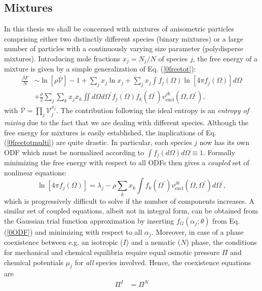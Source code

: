 {\subsection{Mixtures}
In this thesis we shall be concerned with mixtures of anisometric particles
comprising either two distinctly different species (binary mixtures) or
a large number of particles with a continuously varying  size parameter
(polydisperse mixtures). Introducing  mole fractions $x_{j}=N_{j}/N$ of
species $j$,  the free energy of a mixture is given by a simple generalization of Eq. (\ref{0freetot}):
\begin{align}
\frac{\beta F}{N} &\sim \ln [\rho \mathcal{\bar{V}}]-1 + \sum_{j} x_{j} \ln x_{j} +
\sum_{j} x_{j} \int f_{j}(\Omega)\ln \left[ 4 \pi f_{j}(\Omega) \right] d \Omega \nonumber \\
&+\frac{\rho}{2}\sum_{j}\sum_{k}x_{j}x_{k} \iint  d \Omega d\Omega^{\prime}
f_{j}(\Omega)f_{k}(\Omega^{\prime})
v_{\text{excl}}^{jk}(\Omega,\Omega^{\prime}),  \label{0freetotmulti}
\end{align}
with $\mathcal{\bar{V}}=\prod_{j}\mathcal{V}_{j}^{x_{j}}$. The contribution following the ideal entropy is an {\em entropy of mixing} due to the fact that we are dealing with different species.
Although the free energy for mixtures is easily established,  the implications of Eq. (\ref{0freetotmulti})
are quite drastic. In particular, each species $j$ now has its own ODF
which must be normalized according to $\int f_{j}(d\Omega)d\Omega \equiv 1$. Formally minimizing the free energy
with respect to all ODFs then gives a {\em coupled} set of nonlinear equations:
\begin{equation}
\ln[4\pi f_{j}(\Omega)]=\lambda_{j} - \rho \sum_{k} x_{k} \int f_{k}(\Omega^{\prime})v_{\text{excl}}^{jk}(\Omega,\Omega^{\prime})
d\Omega^{\prime}, \label{0inteqmulti}
\end{equation}
which  is  progressively difficult to solve if the number of components increases.
A similar set of coupled equations, albeit not in integral form,
can be obtained from the Gaussian trial function approximation by inserting
$f_{G}(\alpha_{j};\theta)$ from Eq. (\ref{0ODF}) and minimizing with respect to all $\alpha_{j}$.
Moreover, in case of a phase coexistence between e.g. an isotropic ($I$) and a nematic ($N$) phase, the conditions for
mechanical and chemical equilibria require equal osmotic pressure $\Pi$ and chemical potentials $\mu_{j}$ for {\em all} species involved.
Hence, the coexistence equations are
\begin{align}
\Pi^{I}&=\Pi^{N} \nonumber \\

\end{align}}
